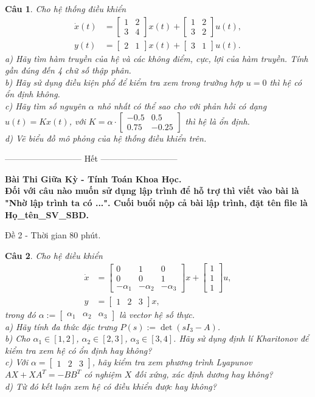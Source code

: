 \documentclass[11pt]{article}
\newtheorem{bt}{Câu}
\def\a{\alpha}
\newcommand{\m}[1]{
	\begin{bmatrix}
		#1
	\end{bmatrix}
}
\begin{document}
\begin{bt}\label{Câu 1b}
	Cho hệ thống điều khiển
	\begin{align}
		\dot{x}(t) &= \m{1 & 2 \\ 3 & 4} x(t) + \m{1 & 2 \\ 3 & 2} u(t), \\
		y(t) &= \m{2 & 1} x(t) + \m{3 & 1} u(t). 
	\end{align}
	a) Hãy tìm hàm truyền của hệ và các không điểm, cực, lợi của hàm truyền. Tính gần đúng đến 4 chữ số thập phân. \\
	b) Hãy sử dụng điều kiện phổ để kiểm tra xem trong trường hợp $u=0$ thì hệ có ổn định không. \\
	c) Hãy tìm số nguyên $\a$ nhỏ nhất có thể sao cho với phản hồi có dạng $u(t) = K x(t)$, với $K = \a \cdot \m{ -0.5 & 0.5 \\ 0.75 & -0.25}$ thì hệ là ổn định. \\ 
	d) Vẽ biểu đồ mô phỏng của hệ thống điều khiển trên.
\end{bt}

\begin{center}
	--------------------------- Hết ---------------------------
\end{center}

\pagebreak 



\begin{center}
	{\bf Bài Thi Giữa Kỳ - Tính Toán Khoa Học. \\
		Đối với câu nào muốn sử dụng lập trình để hỗ trợ thì viết vào bài là "Nhờ lập trình ta có ...". Cuối buổi nộp cả bài lập trình, đặt tên file là Họ\_tên\_SV\_SBD.}
\end{center}

\begin{center}
	Đề 2 - Thời gian 80 phút.
\end{center}

\begin{bt}
Cho hệ điều khiển
%
\begin{align}\label{eq3}
	\dot{x} &= \m{0 & 1 & 0 \\ 0 & 0 & 1 \\ -\a_1 & -\a_2 & -\a_{3} } x + \m{1 \\ 1 \\ 1} u, \\
	y &= \m{1 & 2 & 3} x, 
\end{align}
%
trong đó $\a := \m{\a_1 & \a_2 & \a_3 }$ là vector hệ số thực. \\
a) Hãy tính đa thức đặc trưng $P(s) := \det(sI_3-A)$. \\
b) Cho $\a_1 \in [1,2]$, $\a_2 \in [2,3]$, $\a_3 \in [3,4]$. Hãy sử dụng định lí Kharitonov để kiểm tra xem hệ có ổn định hay không? \\
c) Với $\a = \m{1 & 2 & 3}$, hãy kiểm tra xem phương trình Lyapunov $A X + X A^T = -B B^T$ có nghiệm $X$ đối xứng, xác định dương hay không? \\  
d) Từ đó kết luận xem hệ có điều khiển được hay không?
\end{bt}   
\end{document}
